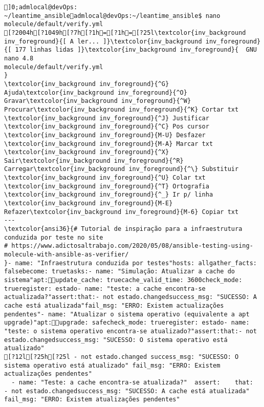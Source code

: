 \documentclass{scrartcl}
\title{}
\begin{document}
\begin{Verbatim}
]0;admlocal@devOps: ~/leantime_ansibleadmlocal@devOps:~/leantime_ansible$ nano molecule/default/verify.yml 
[?2004h[?1049h[?7h[?1h=[?1h=[?25l\textcolor{inv_background inv_foreground}{[ A ler... ]}\textcolor{inv_background inv_foreground}{[ 177 linhas lidas ]}\textcolor{inv_background inv_foreground}{  GNU nano 4.8                                          molecule/default/verify.yml                                                       }
\textcolor{inv_background inv_foreground}{^G} Ajuda\textcolor{inv_background inv_foreground}{^O} Gravar\textcolor{inv_background inv_foreground}{^W} Procurar\textcolor{inv_background inv_foreground}{^K} Cortar txt    \textcolor{inv_background inv_foreground}{^J} Justificar    \textcolor{inv_background inv_foreground}{^C} Pos cursor    \textcolor{inv_background inv_foreground}{M-U} Desfazer     \textcolor{inv_background inv_foreground}{M-A} Marcar txt
\textcolor{inv_background inv_foreground}{^X} Sair\textcolor{inv_background inv_foreground}{^R} Carregar\textcolor{inv_background inv_foreground}{^\} Substituir    \textcolor{inv_background inv_foreground}{^U} Colar txt     \textcolor{inv_background inv_foreground}{^T} Ortografia    \textcolor{inv_background inv_foreground}{^_} Ir p/ linha   \textcolor{inv_background inv_foreground}{M-E} Refazer\textcolor{inv_background inv_foreground}{M-6} Copiar txt
---
\textcolor{ansi36}{# Tutorial de inspiração para a infraestrutura conduzida por teste no site
# https://www.adictosaltrabajo.com/2020/05/08/ansible-testing-using-molecule-with-ansible-as-verifier/
}- name: "Infraestrutura conduzida por testes"hosts: allgather_facts: falsebecome: truetasks:- name: "Simulação: Atualizar a cache do sistema"apt:update_cache: truecache_valid_time: 3600check_mode: trueregister: estado- name: "teste: a cache encontra-se actualizada?"assert:that:- not estado.changedsuccess_msg: "SUCESSO: A cache está atualizada"fail_msg: "ERRO: Existem actualizações pendentes"- name: "Atualizar o sistema operativo (equivalente a apt upgrade)"apt:upgrade: safecheck_mode: trueregister: estado- name: "teste: o sistema operativo encontra-se atualizado?"assert:that:- not estado.changedsuccess_msg: "SUCESSO: O sistema operativo está atualizado"
[?12l[?25h[?25l - not estado.changed success_msg: "SUCESSO: O sistema operativo está atualizado" fail_msg: "ERRO: Existem actualizações pendentes"
  - name: "Teste: a cache encontra-se atualizada?"  assert:    that:    - not estado.changedsuccess_msg: "SUCESSO: A cache está atualizada"    fail_msg: "ERRO: Existem atualizações pendentes"

\end{Verbatim}
\end{document}
